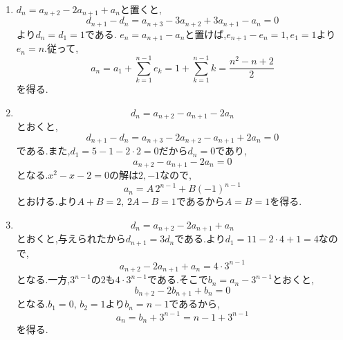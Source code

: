   \noindent{}\par\nobreak
  \begin{enumerate}[label=(\arabic*),parsep=3pt,format=\bookitemlink{example-four-term-1}{solution}{problem}]
    \item $d_n=a_{n+2}-2a_{n+1}+a_n$と置くと,
          \[
            d_{n+1}-d_n=a_{n+3}-3a_{n+2}+3a_{n+1}-a_n=0
          \]
          より$d_n=d_1=1$である.
          $e_n=a_{n+1}-a_n$と置けば,$e_{n+1}-e_n=1,e_1=1$より$e_n=n$.従って,
          \[
            a_n=a_1+\sum_{k=1}^{n-1}e_k
                =1+\sum_{k=1}^{n-1}k
                =\frac{n^2-n+2}{2}
          \]
          を得る.
    \item
          \[
            d_n=a_{n+2}-a_{n+1}-2a_n
          \]
          とおくと,
          \[
            d_{n+1}-d_n=a_{n+3}-2a_{n+2}-a_{n+1}+2a_n=0
          \]
          である.また,$d_1=5-1-2\cdot2=0$だから$d_n=0$であり,
          \[
            a_{n+2}-a_{n+1}-2a_n=0
          \]
          となる.$x^2-x-2=0$の解は$2,-1$なので,
          \[
            a_n=A\,2^{n-1}+B(-1)^{n-1}
          \]
          とおける.より$A+B=2,\,2A-B=1$であるから$A=B=1$を得る.
    \item
          \[
            d_n=a_{n+2}-2a_{n+1}+a_n
          \]
          とおくと,与えられたから$d_{n+1}=3d_n$である.より$d_1=11-2\cdot4+1=4$なので,
          \[
            a_{n+2}-2a_{n+1}+a_n=4\cdot3^{n-1}
          \]
          となる.一方,$3^{n-1}$の2も$4\cdot3^{n-1}$である.そこで$b_n=a_n-3^{n-1}$とおくと,
          \[
            b_{n+2}-2b_{n+1}+b_n=0
          \]
          となる.$b_1=0,\,b_2=1$より$b_n=n-1$であるから,
          \[
            a_n=b_n+3^{n-1}=n-1+3^{n-1}
          \]
          を得る.
  \end{enumerate}
